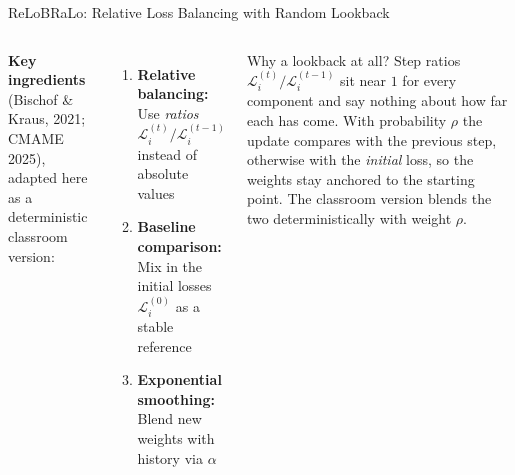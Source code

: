 \documentclass[aspectratio=169,11pt]{beamer}
\newcommand{\emphc}[1]{\textcolor{harvardcrimson}{#1}}
\begin{document}
\begin{frame}{ReLoBRaLo: Relative Loss Balancing with Random Lookback}
\begin{columns}[T]
\textbf{Key ingredients} (Bischof \& Kraus, 2021; CMAME 2025), adapted here as a deterministic classroom version:

\vspace{0.2cm}
\begin{enumerate}
    \item \textbf{Relative balancing:} Use \emph{ratios} $\mathcal{L}_i^{(t)} / \mathcal{L}_i^{(t-1)}$ instead of absolute values

    \vspace{0.2cm}
    \item \textbf{Baseline comparison:} Mix in the \emphc{initial losses} $\mathcal{L}_i^{(0)}$ as a stable reference

    \vspace{0.2cm}
    \item \textbf{Exponential smoothing:} Blend new weights with history via $\alpha$
\end{enumerate}

\begin{block}{Why a lookback at all?}
Step ratios $\mathcal{L}_i^{(t)}/\mathcal{L}_i^{(t-1)}$ sit near $1$ for every component and say nothing about how far each has come. With probability $\rho$ the update compares with the previous step, otherwise with the \emph{initial} loss, so the weights stay anchored to the starting point. The classroom version blends the two deterministically with weight $\rho$.
\end{block}
\end{columns}
\end{frame}
\end{document}
